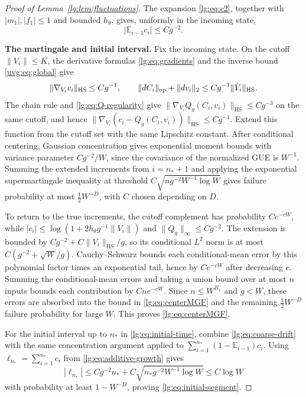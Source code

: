 \documentclass[11pt]{article}
\numberwithin{equation}{section}
\theoremstyle{remark}
\newcommand{\E}{\mathbb E}
\newcommand{\HS}{\mathrm{HS}}
\begin{document}
\begin{proof}[Proof of Lemma~\ref{lg:lem:fluctuations}]
The expansion \eqref{lg:eq:c2}, together with $|m_1|,|f_1|\le1$
and bounded $h_\theta$, gives, uniformly in the incoming state,
\begin{equation}\label{lg:eq:coarse-drift}
 |\E_{i-1}c_i|\le Cg^{-2}.
\end{equation}

\noindent\textbf{The martingale and initial interval.}
Fix the incoming state.
On the cutoff $\|V_i\|\le K$, the derivative formulas \eqref{lg:eq:gradients}
and the inverse bound \eqref{uvg:eq:global} give
\[
 \|\nabla_{V_i}c_i\|_\HS\le Cg^{-1},\qquad
 \|dC_i\|_{\rm op}+\|dv_i\|_2\le Cg^{-1}\|\dot V_i\|_\HS.
\]
The chain rule and \eqref{lg:eq:Q-regularity} give
$\|\nabla_{V_i}Q_g(C_i,v_i)\|_\HS\le Cg^{-3}$ on the same cutoff,
and hence $\|\nabla_{V_i}(c_i-Q_g(C_i,v_i))\|_\HS\le Cg^{-1}$.
Extend this function from the cutoff set with the same Lipschitz
constant. After conditional centering, Gaussian concentration gives
exponential moment bounds with variance parameter $Cg^{-2}/W$,
since the covariance of the normalized GUE is $W^{-1}$.
Summing the extended increments from $i=n_*+1$ and applying
the exponential supermartingale inequality at threshold
$C\sqrt{ng^{-2}W^{-1}\log W}$ gives failure probability at most
$\tfrac12W^{-D}$, with $C$ chosen depending on $D$.

To return to the true increments, the cutoff complement has
probability $Ce^{-cW}$, while
$|c_i|\le\log(1+2h_\theta g^{-1}\|V_i\|)$ and
$\|Q_g\|_\infty\le Cg^{-2}$.
The extension is bounded by $Cg^{-2}+C\|V_i\|_\HS/g$, so its
conditional $L^2$ norm is at most $C(g^{-2}+\sqrt W/g)$.
Cauchy--Schwarz bounds each conditional-mean error by this polynomial
factor times an exponential tail, hence by $Ce^{-cW}$ after decreasing $c$.
Summing the conditional-mean errors and taking a union bound over
at most $n$ inputs bounds each contribution by $Cne^{-cW}$. Since $n\le W^{B_1}$ and $g<W$, these
errors are absorbed into the bound in \eqref{lg:eq:centerMGF}
and the remaining $\tfrac12W^{-D}$ failure probability for large $W$.
This proves \eqref{lg:eq:centerMGF}.

For the initial interval up to $n_*$ in \eqref{lg:eq:initial-time},
combine \eqref{lg:eq:coarse-drift} with the same concentration argument
applied to $\sum_{i=1}^{n_*}(1-\E_{i-1})c_i$.
Using $\ell_{n_*}=\sum_{i=1}^{n_*}c_i$ from \eqref{lg:eq:additive-growth} gives
\[
 |\ell_{n_*}|\le Cg^{-2}n_*
       +C\sqrt{n_*g^{-2}W^{-1}\log W}\le C\log W
\]
with probability at least $1-W^{-D}$, proving
\eqref{lg:eq:initial-segment}.
\end{proof}
\end{document}
